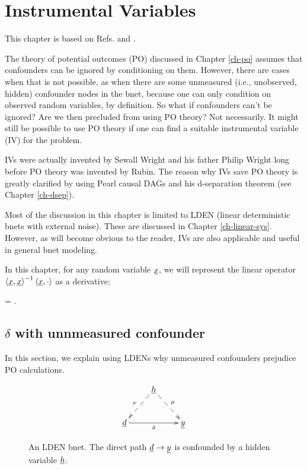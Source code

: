 \chapter{Instrumental Variables}
\label{ch-instrumental}


This chapter is based on
Refs.\cite{book-mixtape} and \cite{wiki-inst-vars}.

The theory of potential outcomes (PO)
discussed in Chapter \ref{ch-po}
assumes that confounders can be ignored
by conditioning on them.
However, there are cases when
that is not possible, as when there are some
unmeasured (i.e., unobserved, hidden)
confounder nodes in the bnet,
because one can
only condition on observed random 
variables, by definition.
So what if confounders can't be ignored?
Are we then precluded from using PO theory?
Not necessarily.
It might still be possible to
use PO theory if one can find a suitable
instrumental variable (IV) for the problem.

IVs were actually invented 
by Sewall Wright and his father Philip
Wright long before
PO theory was invented  by Rubin.
The reason why IVs save PO theory
is greatly clarified by using
Pearl causal DAGs and his d-separation theorem 
(see Chapter \ref{ch-dsep}).

Most of the discussion in this chapter
is  limited to LDEN (linear deterministic
bnets with external noise). These
are discussed in Chapter \ref{ch-linear-sys}.
However, as will become
obvious to the reader, IVs are 
also applicable
and useful
in general bnet modeling.

In this
chapter, 
for any random
variable ${\underline{x}}$, we will represent 
the linear 
operator
$\left\langle{\underline{x}}, {\underline{x}}\right\rangle^{-1}\left\langle{\underline{x}}, \cdot\right\rangle
$ as a derivative:

\beq
{}=
\frac{\av{\rvx, \cdot}}
{\av{\rvx, \rvx}}
\;.
\eeq


\section{$\delta$ with unnmeasured confounder}

In this section,
we explain using LDENs 
why
unmeasured confounders 
prejudice PO calculations.

\begin{figure}[h!]
$$
\xymatrix{
&\rvh\ar@{-->}[dl]_\nu\ar@{-->}[dr]^\mu
\\
\rvd\ar[rr]_\delta&&\rvy
}$$
\caption{An LDEN bnet. The direct path ${\underline{d}}\rightarrow{\underline{y}}$
is confounded by
a hidden variable ${\underline{h}}$.
} 
\label{fig-iv-G-start}
\end{figure}

